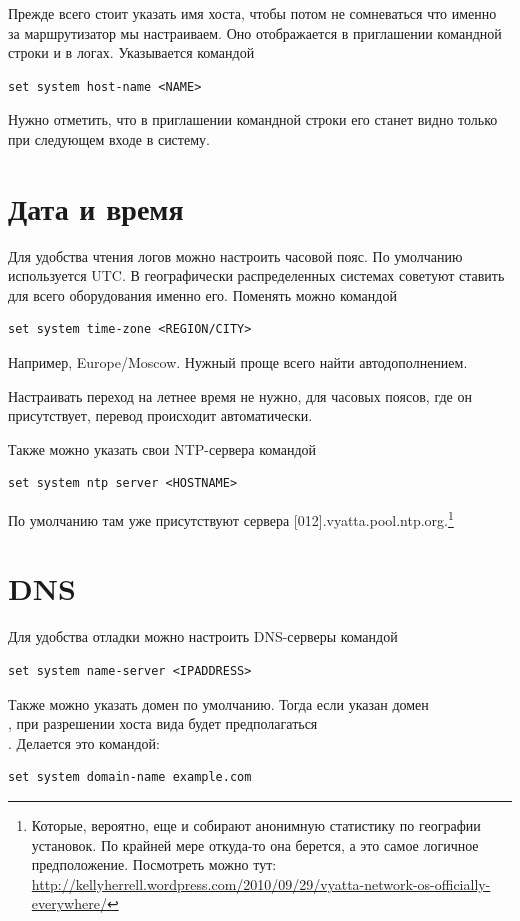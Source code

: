\documentclass[a4paper,12pt, twoside, russian]{report}
\begin{document}
Прежде всего стоит указать имя хоста, чтобы потом не сомневаться что именно за маршрутизатор мы настраиваем.
Оно отображается в приглашении командной строки и в логах. Указывается командой 
\begin{verbatim}set system host-name <NAME>\end{verbatim}

Нужно отметить, что в приглашении командной строки его станет видно только при следующем входе в систему.

\section{Дата и время}
Для удобства чтения логов можно настроить часовой пояс. По умолчанию используется UTC. В географически
распределенных системах советуют ставить для всего оборудования именно его. Поменять можно командой
\begin{verbatim}set system time-zone <REGION/CITY>\end{verbatim}
Например, Europe/Moscow. Нужный проще всего найти автодополнением.

Настраивать переход на летнее время не нужно, для часовых поясов, где он присутствует, перевод происходит
автоматически.

Также можно указать свои NTP-сервера командой \begin{verbatim}set system ntp server <HOSTNAME>\end{verbatim}
По умолчанию там уже присутствуют сервера [012].vyatta.pool.ntp.org.\footnote{Которые, вероятно, еще и собирают
анонимную статистику по географии установок. По крайней мере откуда-то она берется, а это самое логичное
предположение. Посмотреть можно тут: \href{http://kellyherrell.wordpress.com/2010/09/29/vyatta-network-os-officially-everywhere/}
{http://kellyherrell.wordpress.com/2010/09/29/vyatta-network-os-officially-everywhere/}}

\section{DNS}

Для удобства отладки можно настроить DNS-серверы командой \begin{verbatim}set system name-server <IPADDRESS>
\end{verbatim}

Также можно указать домен по умолчанию. Тогда если указан домен\\ , 
при разрешении хоста вида
 будет предполагаться \\ . Делается это командой:
\begin{verbatim}set system domain-name example.com\end{verbatim}
\end{document}
